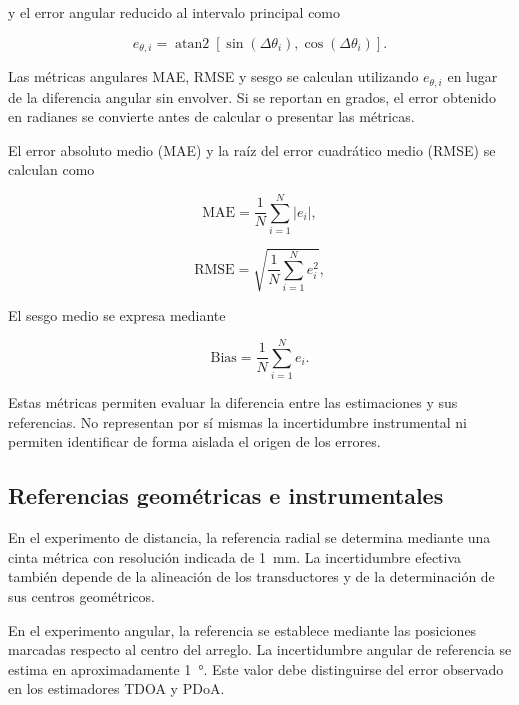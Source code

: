 y el error angular reducido al intervalo principal como

\begin{equation}
    e_{\theta,i}=
    \operatorname{atan2}
    \left[
    \sin(\Delta\theta_i),
    \cos(\Delta\theta_i)
    \right].
    \label{eq:error_angular_principal}
\end{equation}

Las métricas angulares MAE, RMSE y sesgo se
calculan utilizando $e_{\theta,i}$ en lugar
de la diferencia angular sin envolver. Si se
reportan en grados, el error obtenido en radianes
se convierte antes de calcular o presentar
las métricas.

El error absoluto medio (MAE) y la raíz del
error cuadrático medio (RMSE) se calculan como

\begin{equation}
    \mathrm{MAE}=
    \frac{1}{N}\sum_{i=1}^{N}|e_i|,
    \label{eq:mae}
\end{equation}

\begin{equation}
    \mathrm{RMSE}=
    \sqrt{
    \frac{1}{N}\sum_{i=1}^{N}e_i^2
    },
    \label{eq:rmse}
\end{equation}

El sesgo medio se expresa mediante

\begin{equation}
    \mathrm{Bias}=
    \frac{1}{N}\sum_{i=1}^{N}e_i.
    \label{eq:bias}
\end{equation}

Estas métricas permiten evaluar la diferencia
entre las estimaciones y sus referencias.
No representan por sí mismas la incertidumbre
instrumental ni permiten identificar de forma
aislada el origen de los errores.

\subsection{Referencias geométricas e instrumentales}

En el experimento de distancia, la referencia
radial se determina mediante una cinta métrica
con resolución indicada de
\SI{1}{\milli\metre}. La incertidumbre efectiva
también depende de la alineación de los
transductores y de la determinación de sus
centros geométricos.

En el experimento angular, la referencia se
establece mediante las posiciones marcadas
respecto al centro del arreglo. La incertidumbre
angular de referencia se estima en aproximadamente
\SI{1}{\degree}. Este valor debe distinguirse
del error observado en los estimadores TDOA
y PDoA.

